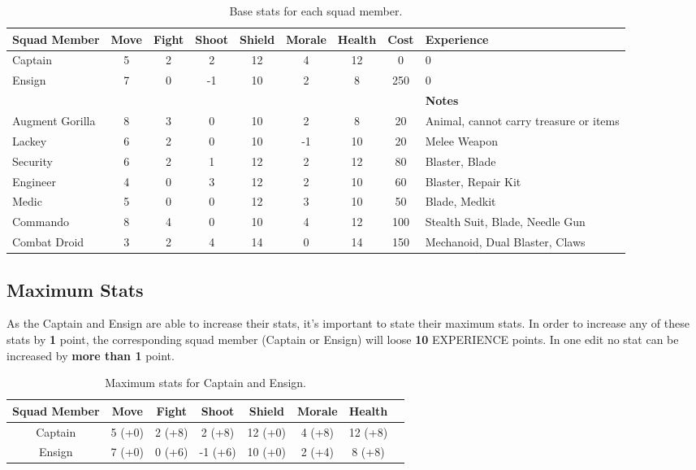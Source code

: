 \documentclass[12pt,a4paper]{article}
\begin{document}
\begin{table}[h]
\begin{center}
\begin{tabular}{|m{1.8cm}|c|c|c|c|c|c|c| m{2.1cm} |}
\hline
{\bf Squad Member} & {\bf Move} & {\bf Fight} & {\bf Shoot} & {\bf Shield} & {\bf Morale} & {\bf Health} & {\bf Cost} & {\bf Experience}\\
\hline
  Captain & 5 & 2 & 2 & 12 & 4 & 12 & 0 & 0\\
  \hline
  Ensign & 7 & 0 & -1 & 10 & 2 & 8 & 250 & 0\\
  \hline
  & & & & & & & & {\bf Notes} \\
  \hline
  Augment Gorilla & 8 & 3 & 0 & 10 & 2 & 8 & 20 & Animal, cannot carry treasure or items\\
  \hline
  Lackey & 6 & 2 & 0 & 10 & -1 & 10 & 20 & Melee Weapon\\
  \hline
  Security & 6 & 2 & 1 & 12 & 2 & 12 & 80 & Blaster, Blade\\
  \hline
  Engineer & 4 & 0 & 3 & 12 & 2 & 10 & 60 & Blaster, Repair Kit\\
  \hline
  Medic & 5 & 0 & 0 & 12 & 3 & 10 & 50 & Blade, Medkit\\
  \hline
  Commando & 8 & 4 & 0 & 10 & 4 & 12 & 100 & Stealth Suit, Blade, Needle Gun\\
  \hline
  Combat Droid & 3 & 2 & 4 & 14 & 0 & 14 & 150 & Mechanoid, Dual Blaster, Claws\\
\hline
\end{tabular}
\end{center}
\caption{Base stats for each squad member.}
\label{Atable:1}
\end{table}

\newpage

\subsection{Maximum Stats}

As the Captain and Ensign are able to increase their stats, it's important to state their maximum stats. In order to increase any of these stats by \textbf{1} point, the corresponding squad member (Captain or Ensign) will loose \textbf{10} EXPERIENCE points. In one edit no stat can be increased by \textbf{more than 1} point.

\begin{table}[!ht]
\begin{center}
\begin{tabular}{|c|c|c|c|c|c|c|c|}
\hline
{\bf Squad Member} & {\bf Move} & {\bf Fight} & {\bf Shoot} & {\bf Shield} & {\bf Morale} & {\bf Health}\\
\hline
  Captain & 5 (+0) & 2 (+8) & 2 (+8) & 12 (+0) & 4 (+8) & 12 (+8)\\
  \hline
  Ensign & 7 (+0) & 0 (+6) & -1 (+6) & 10 (+0) & 2 (+4) & 8 (+8)\\
\hline
\end{tabular}
\end{center}
\caption{Maximum stats for Captain and Ensign.}
\label{simple_table}
\end{table}
\end{document}
